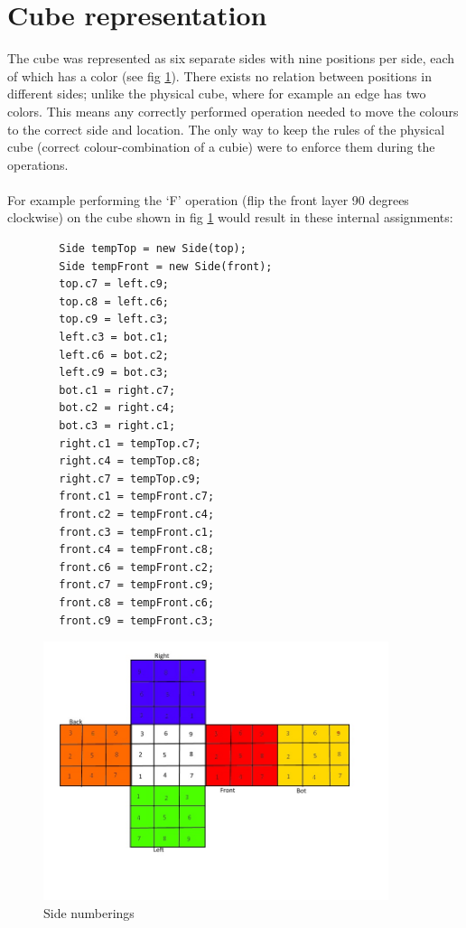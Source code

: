 \documentclass[a4paper,11pt]{kth-mag}
\begin{document}
\section{Cube representation}
 The cube was represented as six separate sides with nine positions per side, each of which has a color (see fig \ref{fig_17}). There exists no relation between positions in different sides; unlike the physical cube, where for example an edge has two colors. This means any correctly performed operation needed to move the colours to the correct side and location. The only way to keep the rules of the physical cube (correct colour-combination of a cubie) were to enforce them during the operations.\\\\
 For example performing the `F' operation (flip the front layer 90 degrees clockwise) on the cube shown in fig \ref{fig_17} would result in these internal assignments:
 \begin{verbatim}
		Side tempTop = new Side(top);
		Side tempFront = new Side(front);
		top.c7 = left.c9;
		top.c8 = left.c6;
		top.c9 = left.c3;
		left.c3 = bot.c1;
		left.c6 = bot.c2;
		left.c9 = bot.c3;
		bot.c1 = right.c7;
		bot.c2 = right.c4;
		bot.c3 = right.c1;
		right.c1 = tempTop.c7;
		right.c4 = tempTop.c8;
		right.c7 = tempTop.c9;
		front.c1 = tempFront.c7;
		front.c2 = tempFront.c4;
		front.c3 = tempFront.c1;
		front.c4 = tempFront.c8;
		front.c6 = tempFront.c2;
		front.c7 = tempFront.c9;
		front.c8 = tempFront.c6;
		front.c9 = tempFront.c3;
\end{verbatim}
\begin{figure}[b]
	\centering
	\includegraphics[width= 0.9\textwidth]{figs/cubeorder.jpg}
	\caption{Side numberings}
	\label{fig_17}
\end{figure}  
\end{document}
